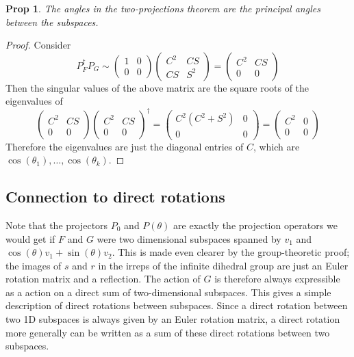 \documentclass[11pt]{article}
\newtheorem{prop}{Prop}
\begin{document}
\begin{prop}
The angles in the two-projections theorem are the principal angles between the subspaces.
\end{prop}

\begin{proof}
    Consider
    $$
    P_F^\dagger P_G \sim \begin{pmatrix}1 & 0 \\ 0 & 0\end{pmatrix} \begin{pmatrix}C^2 & CS \\ CS & S^2\end{pmatrix} = \begin{pmatrix}C^2 & CS \\ 0 & 0\end{pmatrix}
    $$
    Then the singular values of the above matrix are the square roots of the eigenvalues of
    $$
    \begin{pmatrix}C^2 & CS \\ 0 & 0\end{pmatrix} \begin{pmatrix}C^2 & CS \\ 0 & 0\end{pmatrix}^\dagger = \begin{pmatrix}C^2(C^2+S^2) & 0 \\ 0 & 0\end{pmatrix} = \begin{pmatrix}C^2 & 0 \\ 0 & 0\end{pmatrix}
    $$
    Therefore the eigenvalues are just the diagonal entries of $C$, which are $\cos(\theta_1), \dots, \cos(\theta_k)$. 
\end{proof}

\subsection{Connection to direct rotations}
Note that the projectors $P_0$ and $P(\theta)$ are exactly the projection operators we would get if $F$ and $G$ were two dimensional subspaces spanned by $v_1$ and $\cos(\theta)v_1 + \sin(\theta)v_2$. This is made even clearer by the group-theoretic proof; the images of $s$ and $r$ in the irreps of the infinite dihedral group are just an Euler rotation matrix and a reflection. The action of $G$ is therefore always expressible as a action on a direct sum of two-dimensional subspaces. This gives a simple description of direct rotations between subspaces. Since a direct rotation between two 1D subspaces is always given by an Euler rotation matrix, a direct rotation more generally can be written as a sum of these direct rotations between two subspaces.

\nocite{*}


\end{document}
